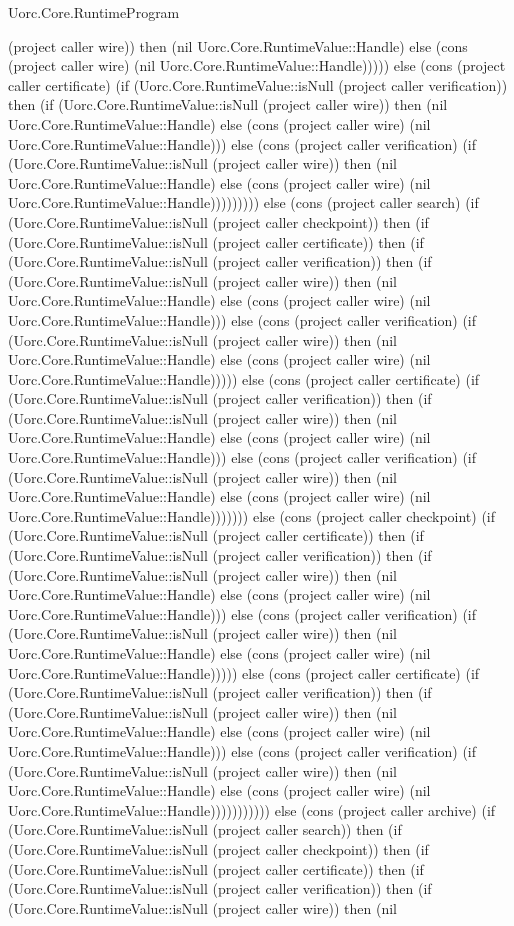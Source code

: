 \begin{lexlean}{Uorc.Core.RuntimeProgram}
\begin{semanticmodule}
{(project caller wire)) then (nil Uorc.Core.RuntimeValue::Handle) else (cons (project caller wire) (nil Uorc.Core.RuntimeValue::Handle))))) else (cons (project caller certificate) (if (Uorc.Core.RuntimeValue::isNull (project caller verification)) then (if (Uorc.Core.RuntimeValue::isNull (project caller wire)) then (nil Uorc.Core.RuntimeValue::Handle) else (cons (project caller wire) (nil Uorc.Core.RuntimeValue::Handle))) else (cons (project caller verification) (if (Uorc.Core.RuntimeValue::isNull (project caller wire)) then (nil Uorc.Core.RuntimeValue::Handle) else (cons (project caller wire) (nil Uorc.Core.RuntimeValue::Handle))))))))) else (cons (project caller search) (if (Uorc.Core.RuntimeValue::isNull (project caller checkpoint)) then (if (Uorc.Core.RuntimeValue::isNull (project caller certificate)) then (if (Uorc.Core.RuntimeValue::isNull (project caller verification)) then (if (Uorc.Core.RuntimeValue::isNull (project caller wire)) then (nil Uorc.Core.RuntimeValue::Handle) else (cons (project caller wire) (nil Uorc.Core.RuntimeValue::Handle))) else (cons (project caller verification) (if (Uorc.Core.RuntimeValue::isNull (project caller wire)) then (nil Uorc.Core.RuntimeValue::Handle) else (cons (project caller wire) (nil Uorc.Core.RuntimeValue::Handle))))) else (cons (project caller certificate) (if (Uorc.Core.RuntimeValue::isNull (project caller verification)) then (if (Uorc.Core.RuntimeValue::isNull (project caller wire)) then (nil Uorc.Core.RuntimeValue::Handle) else (cons (project caller wire) (nil Uorc.Core.RuntimeValue::Handle))) else (cons (project caller verification) (if (Uorc.Core.RuntimeValue::isNull (project caller wire)) then (nil Uorc.Core.RuntimeValue::Handle) else (cons (project caller wire) (nil Uorc.Core.RuntimeValue::Handle))))))) else (cons (project caller checkpoint) (if (Uorc.Core.RuntimeValue::isNull (project caller certificate)) then (if (Uorc.Core.RuntimeValue::isNull (project caller verification)) then (if (Uorc.Core.RuntimeValue::isNull (project caller wire)) then (nil Uorc.Core.RuntimeValue::Handle) else (cons (project caller wire) (nil Uorc.Core.RuntimeValue::Handle))) else (cons (project caller verification) (if (Uorc.Core.RuntimeValue::isNull (project caller wire)) then (nil Uorc.Core.RuntimeValue::Handle) else (cons (project caller wire) (nil Uorc.Core.RuntimeValue::Handle))))) else (cons (project caller certificate) (if (Uorc.Core.RuntimeValue::isNull (project caller verification)) then (if (Uorc.Core.RuntimeValue::isNull (project caller wire)) then (nil Uorc.Core.RuntimeValue::Handle) else (cons (project caller wire) (nil Uorc.Core.RuntimeValue::Handle))) else (cons (project caller verification) (if (Uorc.Core.RuntimeValue::isNull (project caller wire)) then (nil Uorc.Core.RuntimeValue::Handle) else (cons (project caller wire) (nil Uorc.Core.RuntimeValue::Handle))))))))))) else (cons (project caller archive) (if (Uorc.Core.RuntimeValue::isNull (project caller search)) then (if (Uorc.Core.RuntimeValue::isNull (project caller checkpoint)) then (if (Uorc.Core.RuntimeValue::isNull (project caller certificate)) then (if (Uorc.Core.RuntimeValue::isNull (project caller verification)) then (if (Uorc.Core.RuntimeValue::isNull (project caller wire)) then (nil }
\end{semanticmodule}
\end{lexlean}
